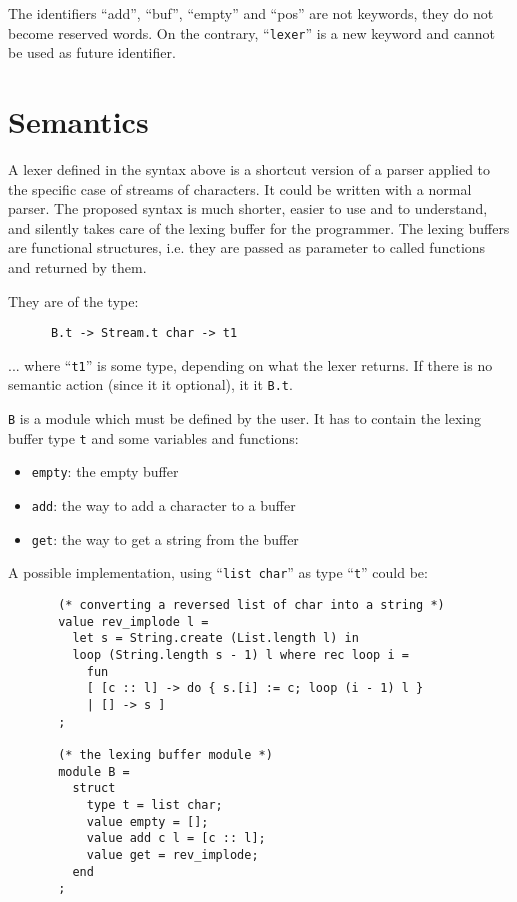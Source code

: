 \documentclass[11pt]{article}
\begin{document}
The identifiers ``add'', ``buf'', ``empty'' and ``pos'' are not
keywords, they do not become reserved words. On the contrary,
``\verb/lexer/'' is a new keyword and cannot be used as future
identifier.

\section{Semantics}
\label{semantics}

A lexer defined in the syntax above is a shortcut version of a parser
applied to the specific case of streams of characters. It could be
written with a normal parser. The proposed syntax is much shorter,
easier to use and to understand, and silently takes care of the lexing
buffer for the programmer. The lexing buffers are functional
structures, i.e. they are passed as parameter to called functions and
returned by them.

They are of the type:

\begin{verbatim}
      B.t -> Stream.t char -> t1
\end{verbatim}

... where ``\verb/t1/'' is some type, depending on what the lexer
returns. If there is no semantic action (since it it optional), it it
\verb/B.t/.

\verb/B/ is a module which must be defined by the user. It has to
contain the lexing buffer type \verb/t/ and some variables and
functions:

\begin{itemize}
\item \verb/empty/: the empty buffer
\item \verb/add/: the way to add a character to a buffer
\item \verb/get/: the way to get a string from the buffer
\end{itemize}

A possible implementation, using ``\verb/list char/'' as type
``\verb/t/'' could be:

\begin{verbatim}
       (* converting a reversed list of char into a string *)
       value rev_implode l =
         let s = String.create (List.length l) in
         loop (String.length s - 1) l where rec loop i =
           fun
           [ [c :: l] -> do { s.[i] := c; loop (i - 1) l }
           | [] -> s ]
       ;

       (* the lexing buffer module *)
       module B =
         struct
           type t = list char;
           value empty = [];
           value add c l = [c :: l];
           value get = rev_implode;
         end
       ;
\end{verbatim}
\end{document}
